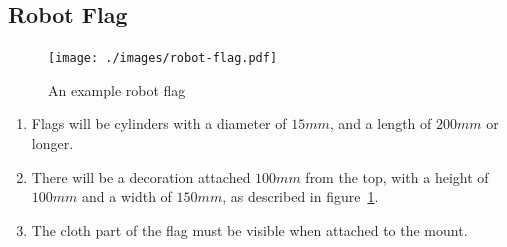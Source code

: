 \subsection{Robot Flag}
\label{sub:robot-flag}

\begin{figure}
  \centering
  \texttt{[image: ./images/robot-flag.pdf]}
  \caption{An example robot flag}
  \label{fig:example-flag}
\end{figure}

\begin{enumerate}
  \item \label{spec:robot-flag} Flags will be cylinders with a diameter
    of $15mm$, and a length of $200mm$ or longer.

  \item There will be a decoration attached $100mm$ from the top, with a height of $100mm$
    and a width of $150mm$, as described in figure~\ref{fig:example-flag}.

  \item The cloth part of the flag must be visible when attached to the mount.
\end{enumerate}

